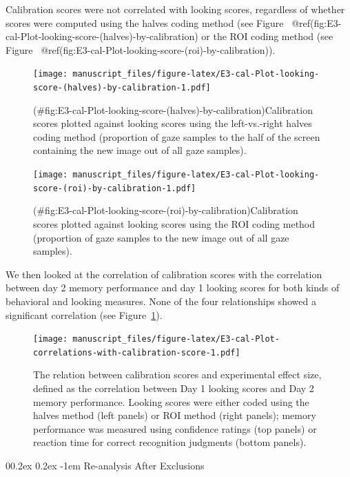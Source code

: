 \documentclass[
  man,floatsintext]{apa6}
\makeatletter
\let\oldparagraph\paragraph
\renewcommand{\paragraph}[1]{\oldparagraph{#1}\mbox{}}
\renewcommand{\paragraph}{\@startsection{paragraph}{4}{\parindent}%
  {0\baselineskip \@plus 0.2ex \@minus 0.2ex}%
  {-1em}%
  {\normalfont\normalsize\bfseries\itshape\typesectitle}}
\makeatother
\begin{document}
Calibration scores were not correlated with looking scores, regardless of whether scores were computed using the halves coding method (see Figure ~@ref(fig:E3-cal-Plot-looking-score-(halves)-by-calibration) or the ROI coding method (see Figure ~@ref(fig:E3-cal-Plot-looking-score-(roi)-by-calibration)).

\begin{figure}
\centering
\texttt{[image: manuscript\_files/figure-latex/E3-cal-Plot-looking-score-(halves)-by-calibration-1.pdf]}
\caption{(\#fig:E3-cal-Plot-looking-score-(halves)-by-calibration)Calibration scores plotted against looking scores using the left-vs.-right halves coding method (proportion of gaze samples to the half of the screen containing the new image out of all gaze samples).}
\end{figure}

\begin{figure}
\centering
\texttt{[image: manuscript\_files/figure-latex/E3-cal-Plot-looking-score-(roi)-by-calibration-1.pdf]}
\caption{(\#fig:E3-cal-Plot-looking-score-(roi)-by-calibration)Calibration scores plotted against looking scores using the ROI coding method (proportion of gaze samples to the new image out of all gaze samples).}
\end{figure}

We then looked at the correlation of calibration scores with the correlation between day 2 memory performance and day 1 looking scores for both kinds of behavioral and looking measures. None of the four relationships showed a significant correlation (see Figure~\ref{fig:E3-cal-Plot-correlations-with-calibration-score}).

\begin{figure}
\centering
\texttt{[image: manuscript\_files/figure-latex/E3-cal-Plot-correlations-with-calibration-score-1.pdf]}
\caption{\label{fig:E3-cal-Plot-correlations-with-calibration-score}The relation between calibration scores and experimental effect size, defined as the correlation between Day 1 looking scores and Day 2 memory performance. Looking scores were either coded using the halves method (left panels) or ROI method (right panels); memory performance was measured using confidence ratings (top panels) or reaction time for correct recognition judgments (bottom panels).}
\end{figure}

\paragraph{Re-analysis After Exclusions}\label{re-analysis-after-exclusions-3}
\end{document}
